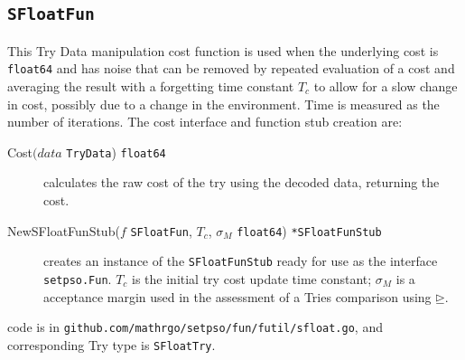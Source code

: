 \documentclass[a4paper,oneside,english]{book}
\numberwithin{equation}{section}
\numberwithin{figure}{section}
\newcommand{\codesorc}[1]{\texttt{github.com/mathrgo/setpso/#1}}
\begin{document}
\subsection{\texttt{SFloatFun}}
This  Try Data manipulation cost function is used when the underlying cost is  \texttt{float64} and has noise that can be removed by repeated evaluation of a cost and averaging the result with a forgetting time constant $T_c$ to allow for a slow change in cost, possibly due to a change in the environment. Time is measured as the number of iterations. The cost interface and function stub creation  are:
\begin{description}
	\item[Cost$ (data $ \texttt{TryData}) \texttt{float64}] calculates the raw cost of the try using the decoded data, returning  the cost.
	\item[NewSFloatFunStub($ f $ \texttt{SFloatFun}, $ T_c $, $ \sigma_M $ \texttt{float64}) \texttt{*SFloatFunStub} ] creates an instance of the \texttt{SFloatFunStub} ready for use as the interface \texttt{setpso.Fun}. $ T_c $ is the initial try cost update time constant; $ \sigma_M $ is a acceptance margin used in the assessment of a Tries comparison using $ \unrhd $.
\end{description}  
code is in \codesorc{fun/futil/sfloat.go}, and corresponding Try type is \texttt{SFloatTry}.
\end{document}

